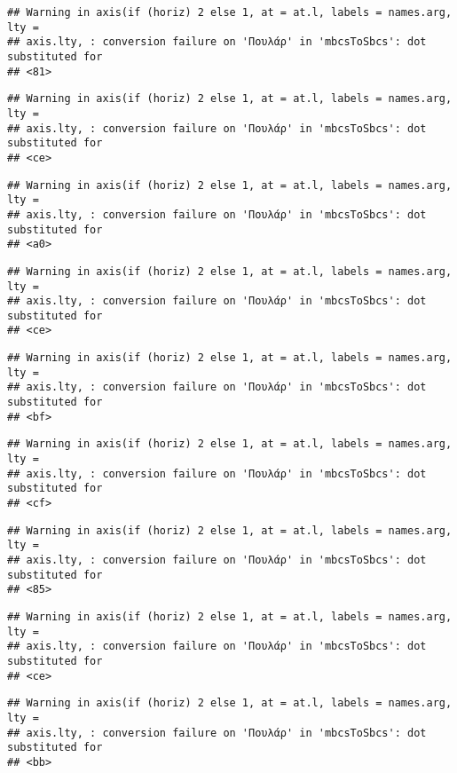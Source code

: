 \documentclass[
]{article}
\begin{document}
\begin{verbatim}
## Warning in axis(if (horiz) 2 else 1, at = at.l, labels = names.arg, lty =
## axis.lty, : conversion failure on 'Πουλάρ' in 'mbcsToSbcs': dot substituted for
## <81>
\end{verbatim}

\begin{verbatim}
## Warning in axis(if (horiz) 2 else 1, at = at.l, labels = names.arg, lty =
## axis.lty, : conversion failure on 'Πουλάρ' in 'mbcsToSbcs': dot substituted for
## <ce>
\end{verbatim}

\begin{verbatim}
## Warning in axis(if (horiz) 2 else 1, at = at.l, labels = names.arg, lty =
## axis.lty, : conversion failure on 'Πουλάρ' in 'mbcsToSbcs': dot substituted for
## <a0>
\end{verbatim}

\begin{verbatim}
## Warning in axis(if (horiz) 2 else 1, at = at.l, labels = names.arg, lty =
## axis.lty, : conversion failure on 'Πουλάρ' in 'mbcsToSbcs': dot substituted for
## <ce>
\end{verbatim}

\begin{verbatim}
## Warning in axis(if (horiz) 2 else 1, at = at.l, labels = names.arg, lty =
## axis.lty, : conversion failure on 'Πουλάρ' in 'mbcsToSbcs': dot substituted for
## <bf>
\end{verbatim}

\begin{verbatim}
## Warning in axis(if (horiz) 2 else 1, at = at.l, labels = names.arg, lty =
## axis.lty, : conversion failure on 'Πουλάρ' in 'mbcsToSbcs': dot substituted for
## <cf>
\end{verbatim}

\begin{verbatim}
## Warning in axis(if (horiz) 2 else 1, at = at.l, labels = names.arg, lty =
## axis.lty, : conversion failure on 'Πουλάρ' in 'mbcsToSbcs': dot substituted for
## <85>
\end{verbatim}

\begin{verbatim}
## Warning in axis(if (horiz) 2 else 1, at = at.l, labels = names.arg, lty =
## axis.lty, : conversion failure on 'Πουλάρ' in 'mbcsToSbcs': dot substituted for
## <ce>
\end{verbatim}

\begin{verbatim}
## Warning in axis(if (horiz) 2 else 1, at = at.l, labels = names.arg, lty =
## axis.lty, : conversion failure on 'Πουλάρ' in 'mbcsToSbcs': dot substituted for
## <bb>
\end{verbatim}
\end{document}
